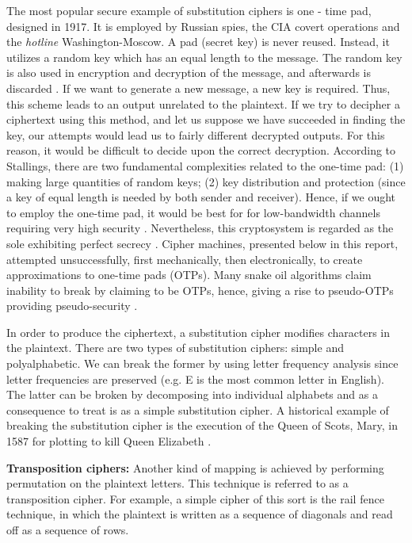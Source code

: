 The most popular secure example of substitution ciphers is one - time pad, designed in 1917. It is employed by Russian spies, the CIA covert operations and the \emph{hotline} Washington-Moscow. A pad (secret key) is never reused. Instead, it utilizes a random key which has an equal length to the message. The random key is also used in encryption and decryption of the message, and afterwards is discarded \cite{stallings2011}. If we want to generate a new message, a new key is required. Thus, this scheme leads to an output unrelated to the plaintext. If we try to decipher a ciphertext using this method, and let us suppose we have succeeded in finding the key, our attempts would lead us to fairly different decrypted outputs. For this reason, it would be difficult to decide upon the correct decryption. According to Stallings, there are two fundamental complexities related to the one-time pad: (1) making large quantities of random keys; (2) key distribution and protection (since a key of equal length is needed by both sender and receiver). Hence, if we ought to employ the one-time pad, it would be best for  for low-bandwidth channels requiring very high security \cite{stallings2011}. Nevertheless, this cryptosystem is regarded as the sole exhibiting perfect secrecy \cite{stallings2011}. Cipher machines, presented below in this report, attempted unsuccessfully, first mechanically, then electronically, to create approximations to one-time pads (OTPs). Many snake oil algorithms claim inability to break by claiming to be OTPs, hence, giving a rise to pseudo-OTPs providing pseudo-security \cite{curtin1998}.

In order to produce the ciphertext, a substitution cipher modifies characters in the plaintext. There are two types of substitution ciphers: simple and polyalphabetic. We can break the former by using letter frequency analysis since letter frequencies are preserved (e.g. E is the most common letter in English). The latter can be broken by decomposing into individual alphabets and as a consequence to treat is as a simple substitution cipher. A historical example of breaking the substitution cipher is the execution of the Queen of Scots, Mary, in 1587 for plotting to kill Queen Elizabeth \cite{maryscots}.

\textbf{Transposition ciphers:} Another kind of mapping is achieved by performing permutation on the plaintext letters. This technique is referred to as a transposition cipher. For example, a simple cipher of this sort is the rail fence technique, in which the plaintext is written as a sequence of diagonals and read off as a sequence of rows.

